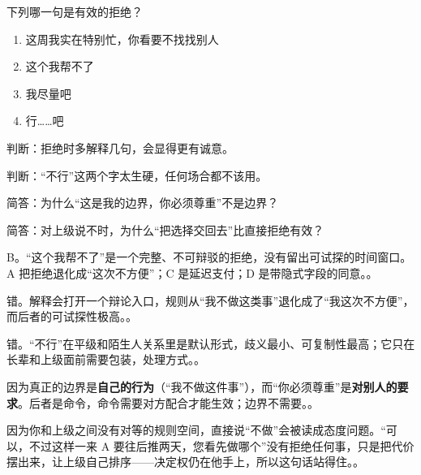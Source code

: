 \begin{quizsec}
\item 下列哪一句是有效的拒绝？

\begin{enumerate}[label=\Alph*., leftmargin=2.2em, labelsep=0.6em,
                  itemsep=0.2em, topsep=0.3em, parsep=0.1em]
\item 这周我实在特别忙，你看要不找找别人
\item 这个我帮不了
\item 我尽量吧
\item 行……吧
\end{enumerate}

\item 判断：拒绝时多解释几句，会显得更有诚意。

\item 判断：“不行”这两个字太生硬，任何场合都不该用。

\item 简答：为什么“这是我的边界，你必须尊重”不是边界？

\item 简答：对上级说不时，为什么“把选择交回去”比直接拒绝有效？
\end{quizsec}

\begin{answerssec}
\item B。“这个我帮不了”是一个完整、不可辩驳的拒绝，没有留出可试探的时间窗口。A 把拒绝退化成“这次不方便”；C 是延迟支付；D 是带隐式字段的同意。。

\item 错。解释会打开一个辩论入口，规则从“我不做这类事”退化成了“我这次不方便”，而后者的可试探性极高。。

\item 错。“不行”在平级和陌生人关系里是默认形式，歧义最小、可复制性最高；它只在长辈和上级面前需要包装，处理方式。。

\item 因为真正的边界是\textbf{自己的行为}（“我不做这件事”），而“你必须尊重”是\textbf{对别人的要求}。后者是命令，命令需要对方配合才能生效；边界不需要。。

\item 因为你和上级之间没有对等的规则空间，直接说“不做”会被读成态度问题。“可以，不过这样一来 A 要往后推两天，您看先做哪个”没有拒绝任何事，只是把代价摆出来，让上级自己排序——决定权仍在他手上，所以这句话站得住。。
\end{answerssec}

